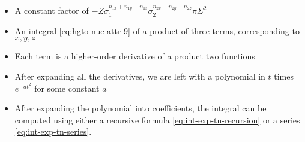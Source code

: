 \documentclass{article}
\begin{document}
\begin{appendices}
\begin{itemize}
\item A constant factor of \(-Z \sigma_1^{n_{1x} + n_{1y} + n_{1z}} \sigma_2^{n_{2x} + n_{2y} + n_{2z}} \pi \Sigma^2 \)
\item An integral \eqref{eq:hgto-nuc-attr-9} of a product of three terms, corresponding to \(x, y, z\)
\item Each term is a higher-order derivative of a product two functions
\item After expanding all the derivatives, we are left with a polynomial in \(t\) times \(e^{-at^2}\) for some constant \(a\)
\item After expanding the polynomial into coefficients, the integral can be computed using either a recursive formula \eqref{eq:int-exp-tn-recursion} or a series \eqref{eq:int-exp-tn-series}.
\end{itemize}

\end{appendices}
\end{document}
